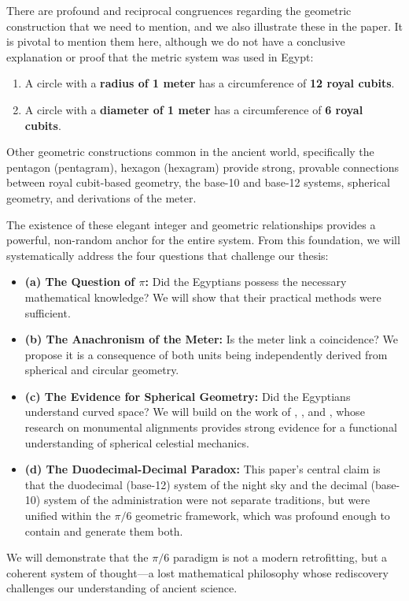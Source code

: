 \documentclass[11pt]{article}
\begin{document}
There are profound and reciprocal congruences regarding the geometric construction that we need to mention, and we also illustrate these in the paper. It is pivotal to mention them here, although we do not have a conclusive explanation or proof that the metric system was used in Egypt:
\begin{enumerate}
    \item A circle with a \textbf{radius of 1 meter} has a circumference of \textbf{12 royal cubits}.
    \item A circle with a \textbf{diameter of 1 meter} has a circumference of \textbf{6 royal cubits}.
\end{enumerate}

Other geometric constructions common in the ancient world, specifically the pentagon (pentagram), hexagon (hexagram) provide strong, provable connections between royal cubit-based geometry, the base-10 and base-12 systems, spherical geometry, and derivations of the meter. 

The existence of these elegant integer and geometric relationships provides a powerful, non-random anchor for the entire system. From this foundation, we will systematically address the four questions that challenge our thesis:
\begin{itemize}
    \item \textbf{(a) The Question of $\pi$:} Did the Egyptians possess the necessary mathematical knowledge? We will show that their practical methods were sufficient.
    \item \textbf{(b) The Anachronism of the Meter:} Is the meter link a coincidence? We propose it is a consequence of both units being independently derived from spherical and circular geometry.
    \item \textbf{(c) The Evidence for Spherical Geometry:} Did the Egyptians understand curved space? We will build on the work of \cite{spence2000ancient}, \cite{magli2013architecture}, and \cite{belmonte2023astronomy}, whose research on monumental alignments provides strong evidence for a functional understanding of spherical celestial mechanics.
    \item \textbf{(d) The Duodecimal-Decimal Paradox:} This paper's central claim is that the duodecimal (base-12) system of the night sky and the decimal (base-10) system of the administration were not separate traditions, but were unified within the $\pi/6$ geometric framework, which was profound enough to contain and generate them both.
\end{itemize}
We will demonstrate that the $\pi/6$ paradigm is not a modern retrofitting, but a coherent system of thought---a lost mathematical philosophy whose rediscovery challenges our understanding of ancient science.
\end{document}
